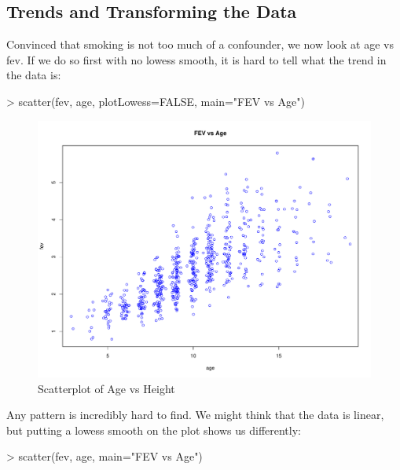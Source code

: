 \documentclass[landscape]{article}
\renewenvironment{Schunk}{\vspace{\topsep}}{\vspace{\topsep}}
\begin{document}
\subsection{Trends and Transforming the Data}
Convinced that smoking is not too much of a confounder, we now look at age vs fev. If we do so first with no lowess smooth, it is hard to tell what the trend in the data is:\\
\begin{Schunk}
\begin{Sinput}
> scatter(fev, age, plotLowess=FALSE, main="FEV vs Age")
\end{Sinput}
\end{Schunk}
\begin{figure}[h]
\centering
\includegraphics[scale=.005]{fevdoc-agefevscatter}
\caption{Scatterplot of Age vs Height}
\label{agefevscatter}
\end{figure}Any pattern is incredibly hard to find. We might think that the data is linear, but putting a lowess smooth on the plot shows us differently:\\
\begin{Schunk}
\begin{Sinput}
> scatter(fev, age, main="FEV vs Age")
\end{Sinput}
\end{Schunk}
\end{document}
